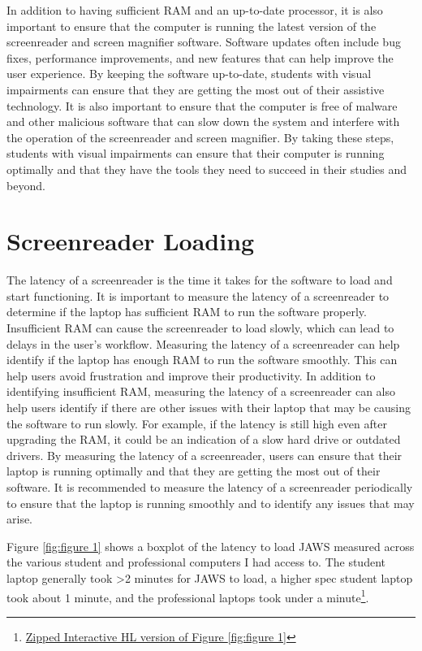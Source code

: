 In addition to having sufficient RAM and an up-to-date processor, it is also important to ensure that the computer is running the latest version of the screenreader and screen magnifier software. Software updates often include bug fixes, performance improvements, and new features that can help improve the user experience. By keeping the software up-to-date, students with visual impairments can ensure that they are getting the most out of their assistive technology. It is also important to ensure that the computer is free of malware and other malicious software that can slow down the system and interfere with the operation of the screenreader and screen magnifier. By taking these steps, students with visual impairments can ensure that their computer is running optimally and that they have the tools they need to succeed in their studies and beyond.

\pagebreak \hypertarget{screenreader-loading}{}\section{Screenreader Loading}\label{screenreader-loading}
The latency of a screenreader is the time it takes for the software to load and start functioning. It is important to measure the latency of a screenreader to determine if the laptop has sufficient RAM to run the software properly. Insufficient RAM can cause the screenreader to load slowly, which can lead to delays in the user’s workflow. Measuring the latency of a screenreader can help identify if the laptop has enough RAM to run the software smoothly. This can help users avoid frustration and improve their productivity. In addition to identifying insufficient RAM, measuring the latency of a screenreader can also help users identify if there are other issues with their laptop that may be causing the software to run slowly. For example, if the latency is still high even after upgrading the RAM, it could be an indication of a slow hard drive or outdated drivers. By measuring the latency of a screenreader, users can ensure that their laptop is running optimally and that they are getting the most out of their software. It is recommended to measure the latency of a screenreader periodically to ensure that the laptop is running smoothly and to identify any issues that may arise.

Figure \ref{fig:figure 1} shows a boxplot of the latency to load JAWS measured across the various student and professional computers I had access to. The student laptop generally took \textgreater2 minutes for JAWS to load, a higher spec student laptop took about 1 minute, and the professional laptops took under a minute\footnote{\raggedright \href{http://github.com/mrhunsaker/MiscResources/raw/main/ComputerRBDisplaySpecsTVIFig1.zip}{Zipped Interactive HL version of Figure \ref{fig:figure 1}}}.

